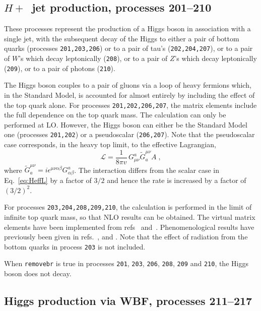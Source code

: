 \subsection{$H+$~jet production, processes 201--210}
\label{subsec:hjet}

These processes represent the production of a Higgs boson in association
with a single jet, with the subsequent decay of the Higgs to either
a pair of bottom quarks (processes {\tt 201,203,206}) 
or to a pair of tau's ({\tt 202,204,207}),
or to a pair of $W$'s which decay leptonically ({\tt 208}),
or to a pair of $Z$'s which decay leptonically ({\tt 209}),
or to a pair of photons ({\tt 210}).

The Higgs boson couples to a pair of gluons via a loop of heavy fermions
which, in the Standard Model, is accounted for almost entirely by including
the effect of the top quark alone. For processes {\tt 201,202,206,207}, the
matrix elements include the full dependence on the top quark mass.
The calculation can only be performed at LO. 
However, the Higgs boson can either be the Standard Model one
(processes {\tt 201,202}) or a pseudoscalar ({\tt 206,207}).
Note that the pseudoscalar case corresponds, in the heavy top limit, to the effective Lagrangian,
\begin{equation}
\mathcal{L} = \frac{1}{8\pi v} \, G^a_{\mu\nu} \widetilde G^{\mu\nu}_a A \;,
\end{equation}
where $\widetilde G^{\mu\nu}_a = i\epsilon^{\mu\nu\alpha\beta}
 G_{\alpha\beta}^a$.
The interaction differs from the scalar case in Eq.~{\ref{eq:HeffL}} by a factor of $3/2$
and hence the rate is increased by a factor of $(3/2)^2$.


For processes {\tt 203,204,208,209,210}, the calculation is performed in the
limit of infinite top quark mass, so that NLO results can be obtained.
The virtual matrix elements have been implemented from
refs~\cite{Ravindran:2002dc} and~\cite{Schmidt:1997wr}.
Phenomenological results have previously been 
given in refs.~\cite{deFlorian:1999zd},\cite{Ravindran:2002dc} 
and \cite{Glosser:2002gm}.
Note that the effect of radiation from the bottom quarks in process {\tt 203}
is not included.

When {\tt removebr} is true in processes {\tt 201}, {\tt 203}, {\tt 206}, {\tt 208}, {\tt 209}
and {\tt 210}, the Higgs boson does not decay.

\subsection{Higgs production via WBF, processes 211--217}
\label{subsec:wbf}

